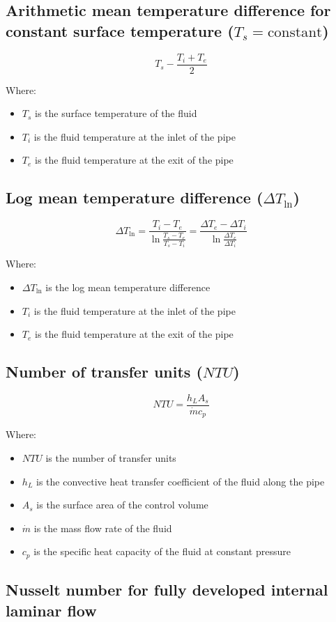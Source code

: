 \documentclass[11pt]{article}
\begin{document}
 \newpage
\subsection{Arithmetic mean temperature difference for constant surface temperature (\(T_s = \text{constant}\))}
\label{sec:org128b122}
\[T_s - \frac{T_i + T_e}{2}\]

Where:
\begin{itemize}
\item \(T_s\) is the surface temperature of the fluid
\item \(T_i\) is the fluid temperature at the inlet of the pipe
\item \(T_e\) is the fluid temperature at the exit of the pipe
\end{itemize}
\subsection{Log mean temperature difference (\(\Delta T_{\ln}\))}
\label{sec:org3af7cec}
\[\Delta T_{\ln} = \frac{T_i - T_e}{\ln \frac{T_s - T_e}{T_s - T_i}} = \frac{\Delta T_e - \Delta T_i}{\ln \frac{\Delta T_e}{\Delta T_i}}\]

Where:
\begin{itemize}
\item \(\Delta T_{\ln}\) is the log mean temperature difference
\item \(T_i\) is the fluid temperature at the inlet of the pipe
\item \(T_e\) is the fluid temperature at the exit of the pipe
\end{itemize}
\subsection{Number of transfer units (\(NTU\))}
\label{sec:orgaa472a2}
\[NTU = \frac{h_L A_s}{\dot{m} c_p}\]

Where:
\begin{itemize}
\item \(NTU\) is the number of transfer units
\item \(h_L\) is the convective heat transfer coefficient of the fluid along the pipe
\item \(A_s\) is the surface area of the control volume
\item \(\dot{m}\) is the mass flow rate of the fluid
\item \(c_p\) is the specific heat capacity of the fluid at constant pressure
\end{itemize}
\subsection{Nusselt number for fully developed internal laminar flow}
\label{sec:org36e2af5}
\end{document}
